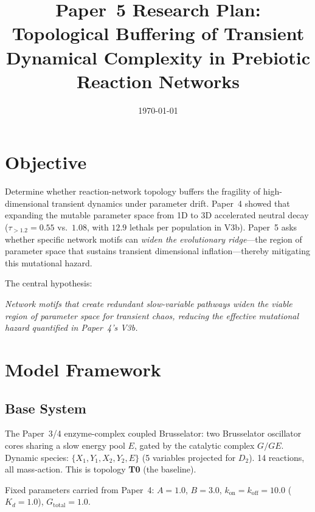 \documentclass[aps,prl,twocolumn,superscriptaddress,floatfix]{revtex4-2}
\newcommand{\tauexp}{\tau_{>1.2}}
\newcommand{\Dtwo}{D_2}
\newcommand{\Kd}{K_d}
\newcommand{\Gtot}{G_{\mathrm{total}}}
\begin{document}
\title{Paper~5 Research Plan: Topological Buffering of Transient\\
Dynamical Complexity in Prebiotic Reaction Networks}
\date{\today}

\maketitle

\section{Objective}

Determine whether reaction-network topology buffers the fragility
of high-dimensional transient dynamics under parameter drift.
Paper~4 showed that expanding the mutable parameter space from
1D to 3D accelerated neutral decay ($\tauexp = 0.55$ vs.\ $1.08$,
with $12.9$ lethals per population in V3b).  Paper~5 asks whether
specific network motifs can \emph{widen the evolutionary ridge}---the
region of parameter space that sustains transient dimensional
inflation---thereby mitigating this mutational hazard.

The central hypothesis:

\emph{Network motifs that create redundant slow-variable pathways
widen the viable region of parameter space for transient chaos,
reducing the effective mutational hazard quantified in Paper~4's V3b.}

\section{Model Framework}

\subsection{Base System}

The Paper~3/4 enzyme-complex coupled Brusselator: two Brusselator
oscillator cores sharing a slow energy pool $E$, gated by the
catalytic complex $G/GE$.  Dynamic species:
$\{X_1, Y_1, X_2, Y_2, E\}$ (5 variables projected for $\Dtwo$).
14 reactions, all mass-action.  This is topology \textbf{T0}
(the baseline).

Fixed parameters carried from Paper~4: $A = 1.0$, $B = 3.0$,
$k_{\mathrm{on}} = k_{\mathrm{off}} = 10.0$
($\Kd = 1.0$), $\Gtot = 1.0$.
\end{document}
